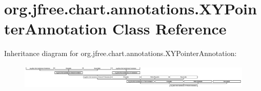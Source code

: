 \hypertarget{classorg_1_1jfree_1_1chart_1_1annotations_1_1_x_y_pointer_annotation}{}\section{org.\+jfree.\+chart.\+annotations.\+X\+Y\+Pointer\+Annotation Class Reference}
\label{classorg_1_1jfree_1_1chart_1_1annotations_1_1_x_y_pointer_annotation}
Inheritance diagram for org.\+jfree.\+chart.\+annotations.\+X\+Y\+Pointer\+Annotation\+:\begin{figure}[H]
\begin{center}
\leavevmode
\includegraphics[height=1.170569cm]{classorg_1_1jfree_1_1chart_1_1annotations_1_1_x_y_pointer_annotation}
\end{center}
\end{figure}
